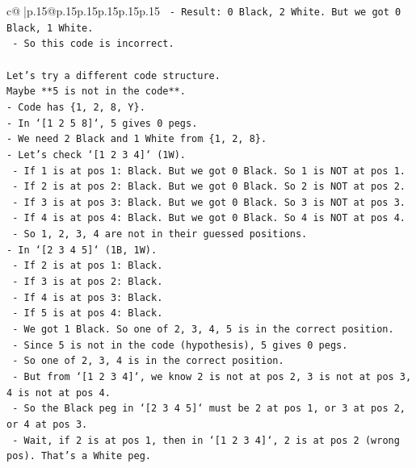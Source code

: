 \documentclass{article}
\begin{document}
{\begin{supertabular}{c@{$\;$}|p{.15\linewidth}@{}p{.15\linewidth}p{.15\linewidth}p{.15\linewidth}p{.15\linewidth}p{.15\linewidth}}
{{{\texttt{        {-} Result: 0 Black, 2 White. But we got 0 Black, 1 White.} \\
\texttt{        {-} So this code is incorrect.} \\
\\ 
\texttt{Let's try a different code structure.} \\
\texttt{Maybe **5 is not in the code**.} \\
\texttt{{-} Code has \{1, 2, 8, Y\}.} \\
\texttt{{-} In `{[}1 2 5 8{]}`, 5 gives 0 pegs.} \\
\texttt{{-} We need 2 Black and 1 White from \{1, 2, 8\}.} \\
\texttt{{-} Let's check `{[}1 2 3 4{]}` (1W).} \\
\texttt{  {-} If 1 is at pos 1: Black. But we got 0 Black. So 1 is NOT at pos 1.} \\
\texttt{  {-} If 2 is at pos 2: Black. But we got 0 Black. So 2 is NOT at pos 2.} \\
\texttt{  {-} If 3 is at pos 3: Black. But we got 0 Black. So 3 is NOT at pos 3.} \\
\texttt{  {-} If 4 is at pos 4: Black. But we got 0 Black. So 4 is NOT at pos 4.} \\
\texttt{  {-} So 1, 2, 3, 4 are not in their guessed positions.} \\
\texttt{{-} In `{[}2 3 4 5{]}` (1B, 1W).} \\
\texttt{  {-} If 2 is at pos 1: Black.} \\
\texttt{  {-} If 3 is at pos 2: Black.} \\
\texttt{  {-} If 4 is at pos 3: Black.} \\
\texttt{  {-} If 5 is at pos 4: Black.} \\
\texttt{  {-} We got 1 Black. So one of 2, 3, 4, 5 is in the correct position.} \\
\texttt{  {-} Since 5 is not in the code (hypothesis), 5 gives 0 pegs.} \\
\texttt{  {-} So one of 2, 3, 4 is in the correct position.} \\
\texttt{  {-} But from `{[}1 2 3 4{]}`, we know 2 is not at pos 2, 3 is not at pos 3, 4 is not at pos 4.} \\
\texttt{  {-} So the Black peg in `{[}2 3 4 5{]}` must be 2 at pos 1, or 3 at pos 2, or 4 at pos 3.} \\
\texttt{  {-} Wait, if 2 is at pos 1, then in `{[}1 2 3 4{]}`, 2 is at pos 2 (wrong pos). That's a White peg.} \\
}}}
\end{supertabular}}
\end{document}
